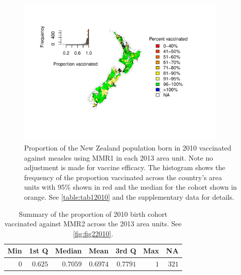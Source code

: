 \documentclass{article}
\begin{document}
\begin{figure}
\begin{center}
    \includegraphics[width=0.9\textwidth]{nir_census_MMR1_NIR_2010.pdf}
\end{center}
    \caption{Proportion of the New Zealand population born in 2010 vaccinated against measles using MMR1 in each 2013 area unit. Note no adjustment is made for vaccine efficacy. The histogram shows the frequency of the proportion vaccinated across the country's area units with 95\% shown in red and the median for the cohort shown in orange. See \autoref{table:tab12010} and the supplementary data for details.}
\label{fig:fig12010}
\end{figure}

 \vspace{5mm} %
\begin{table}
\begin{center}
\begin{tabular}{rrrrrrr}
\hline\hline
\multicolumn{1}{c}{Min}&\multicolumn{1}{c}{1st Q}&\multicolumn{1}{c}{Median}&\multicolumn{1}{c}{Mean}&\multicolumn{1}{c}{3rd Q}&\multicolumn{1}{c}{Max}&\multicolumn{1}{c}{NA}\tabularnewline
\hline
$0$&$0.625$&$0.7059$&$0.6974$&$0.7791$&$1$&$321$\tabularnewline
\hline
\end{tabular}\end{center}\caption{Summary of the proportion of 2010 birth cohort vaccinated against MMR2 across the 2013 area units. See \autoref{fig:fig22010}.}
\label{table:tab22010}
\end{table}
\end{document}
